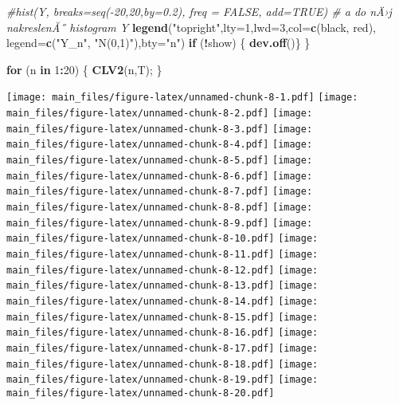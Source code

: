 \documentclass[
]{article}
\newenvironment{Shaded}{\begin{snugshade}}{\end{snugshade}}
\newcommand{\AttributeTok}[1]{\textcolor[rgb]{0.13,0.29,0.53}{#1}}
\newcommand{\CommentTok}[1]{\textcolor[rgb]{0.56,0.35,0.01}{\textit{#1}}}
\newcommand{\ControlFlowTok}[1]{\textcolor[rgb]{0.13,0.29,0.53}{\textbf{#1}}}
\newcommand{\DecValTok}[1]{\textcolor[rgb]{0.00,0.00,0.81}{#1}}
\newcommand{\FunctionTok}[1]{\textcolor[rgb]{0.13,0.29,0.53}{\textbf{#1}}}
\newcommand{\NormalTok}[1]{#1}
\newcommand{\SpecialCharTok}[1]{\textcolor[rgb]{0.81,0.36,0.00}{\textbf{#1}}}
\newcommand{\StringTok}[1]{\textcolor[rgb]{0.31,0.60,0.02}{#1}}
\begin{document}
\begin{Shaded}
\begin{Highlighting}[]
\CommentTok{\#hist(Y, breaks=seq({-}20,20,by=0.2), freq = FALSE, add=TRUE) \# a do nÄ›j nakreslenĂ˝ histogram Y}
  \FunctionTok{legend}\NormalTok{(}\StringTok{"topright"}\NormalTok{,}\AttributeTok{lty=}\DecValTok{1}\NormalTok{,}\AttributeTok{lwd=}\DecValTok{3}\NormalTok{,}\AttributeTok{col=}\FunctionTok{c}\NormalTok{(}\StringTok{\textquotesingle{}black\textquotesingle{}}\NormalTok{, }\StringTok{\textquotesingle{}red\textquotesingle{}}\NormalTok{),}
       \AttributeTok{legend=}\FunctionTok{c}\NormalTok{(}\StringTok{"Y\_n"}\NormalTok{, }\StringTok{"N(0,1)"}\NormalTok{),}\AttributeTok{bty=}\StringTok{"n"}\NormalTok{)  }
  \ControlFlowTok{if}\NormalTok{ (}\SpecialCharTok{!}\NormalTok{show) \{ }\FunctionTok{dev.off}\NormalTok{()\}}
\NormalTok{\}}
\end{Highlighting}
\end{Shaded}

\begin{Shaded}
\begin{Highlighting}[]
\ControlFlowTok{for}\NormalTok{ (n }\ControlFlowTok{in} \DecValTok{1}\SpecialCharTok{:}\DecValTok{20}\NormalTok{) \{ }\FunctionTok{CLV2}\NormalTok{(n,T); \}}
\end{Highlighting}
\end{Shaded}

\texttt{[image: main\_files/figure-latex/unnamed-chunk-8-1.pdf]}
\texttt{[image: main\_files/figure-latex/unnamed-chunk-8-2.pdf]}
\texttt{[image: main\_files/figure-latex/unnamed-chunk-8-3.pdf]}
\texttt{[image: main\_files/figure-latex/unnamed-chunk-8-4.pdf]}
\texttt{[image: main\_files/figure-latex/unnamed-chunk-8-5.pdf]}
\texttt{[image: main\_files/figure-latex/unnamed-chunk-8-6.pdf]}
\texttt{[image: main\_files/figure-latex/unnamed-chunk-8-7.pdf]}
\texttt{[image: main\_files/figure-latex/unnamed-chunk-8-8.pdf]}
\texttt{[image: main\_files/figure-latex/unnamed-chunk-8-9.pdf]}
\texttt{[image: main\_files/figure-latex/unnamed-chunk-8-10.pdf]}
\texttt{[image: main\_files/figure-latex/unnamed-chunk-8-11.pdf]}
\texttt{[image: main\_files/figure-latex/unnamed-chunk-8-12.pdf]}
\texttt{[image: main\_files/figure-latex/unnamed-chunk-8-13.pdf]}
\texttt{[image: main\_files/figure-latex/unnamed-chunk-8-14.pdf]}
\texttt{[image: main\_files/figure-latex/unnamed-chunk-8-15.pdf]}
\texttt{[image: main\_files/figure-latex/unnamed-chunk-8-16.pdf]}
\texttt{[image: main\_files/figure-latex/unnamed-chunk-8-17.pdf]}
\texttt{[image: main\_files/figure-latex/unnamed-chunk-8-18.pdf]}
\texttt{[image: main\_files/figure-latex/unnamed-chunk-8-19.pdf]}
\texttt{[image: main\_files/figure-latex/unnamed-chunk-8-20.pdf]}
\end{document}
